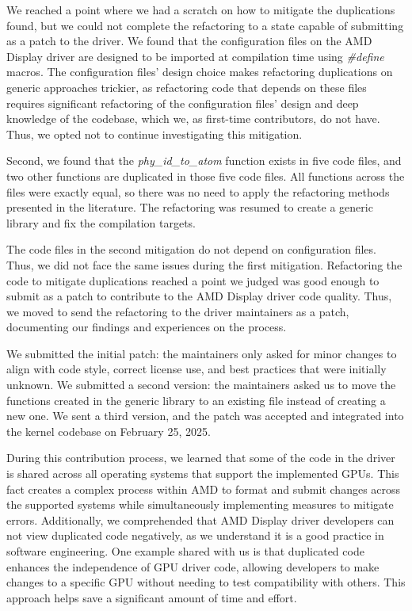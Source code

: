 \documentclass[10pt,conference]{IEEEtran}
\begin{document}
We reached a point where we had a scratch on how to mitigate the duplications found, but we could not complete the refactoring to a state capable of submitting as a patch to the driver. We found that the configuration files on the AMD Display driver are designed to be imported at compilation time using \textit{\#define} macros. The configuration files' design choice makes refactoring duplications on generic approaches trickier, as refactoring code that depends on these files requires significant refactoring of the configuration files' design and deep knowledge of the codebase, which we, as first-time contributors, do not have. Thus, we opted not to continue investigating this mitigation.

Second, we found that the \textit{phy\_id\_to\_atom} function exists in five code files, and two other functions are duplicated 
in those five code files. All functions across the files were exactly equal, 
so there was no need to apply the refactoring methods presented in the literature. 
The refactoring was resumed to create a generic library and fix the compilation targets.

The code files in the second mitigation do not depend on configuration files. Thus, 
we did not face the same issues during the first mitigation. Refactoring the code 
to mitigate duplications reached a point we judged was good enough to submit as a 
patch to contribute to the AMD Display driver code quality. Thus, we moved to send 
the refactoring to the driver maintainers as a patch, documenting our findings and experiences 
on the process.

We submitted the initial patch: the maintainers only asked for minor changes to align with code style, correct license use, and best practices that were initially unknown. We submitted a second version: the maintainers asked us to move the functions created in the generic library to an existing file instead of creating a new one. We sent a third version, and the patch was accepted and integrated into the kernel codebase on February 25, 2025.

During this contribution process, we learned that some of the code in the driver is shared across all operating systems that support the implemented GPUs. This fact creates a complex process within AMD to format and submit changes across the supported systems while simultaneously implementing measures to mitigate errors. Additionally, we comprehended that AMD Display driver developers can not view duplicated code negatively, as we understand it is a good practice in software engineering. One example shared with us is that duplicated code enhances the independence of GPU driver code, allowing developers to make changes to a specific GPU without needing to test compatibility with others. This approach helps save a significant amount of time and effort.
\end{document}
